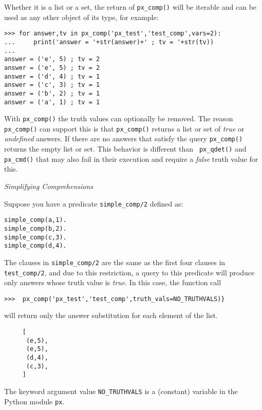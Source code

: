 \begin{example}
Whether it is a list or a set, the return of {\tt px\_comp()} will be
iterable and can be used as any other object of its type, for
example:

{\small
  \begin{verbatim}
>>> for answer,tv in px_comp('px_test','test_comp',vars=2):
...     print('answer = '+str(answer)+' ; tv = '+str(tv))
... 
answer = ('e', 5) ; tv = 2
answer = ('e', 5) ; tv = 2
answer = ('d', 4) ; tv = 1
answer = ('c', 3) ; tv = 1
answer = ('b', 2) ; tv = 1
answer = ('a', 1) ; tv = 1
\end{verbatim}
  }
\end{example}

With {\tt px\_comp()} the truth values can optionally be removed.  The
reason {\tt px\_comp()} can support this is that {\tt px\_comp()}
returns a list or set of {\em true} or {\em undefined} answers.  If
there are no answers that satisfy the query {\tt px\_comp()} returns
the empty list or set.  This behavior is different than {\tt
  px\_qdet()} and {\tt px\_cmd()} that may also fail in their
execution and require a {\em false} truth value for this.

\begin{example} \rm {\it Simplifying Comprehensions} \label{ex:simple-comp}

  Suppose you have a predicate {\tt simple\_comp/2} defined as:

{\small  
\begin{verbatim}  
simple_comp(a,1).
simple_comp(b,2).
simple_comp(c,3).
simple_comp(d,4).
\end{verbatim}
}

  The clauses in {\tt simple\_comp/2} are the same as the first four
  clauses in {\tt test\_comp/2}, and due to this restriction, a query
  to this predicate will produce only answers whose truth value is
  {\em true}.  In this case, the function call

\begin{verbatim}  
>>>  px_comp('px_test','test_comp',truth_vals=NO_TRUTHVALS)}
\end{verbatim}

will return only the answer substitution for each element of the list.

{\small  
\begin{verbatim}
     [
      (e,5),
      (e,5),
      (d,4),
      (c,3),
     ]
\end{verbatim}
}

The keyword argument value {\tt NO\_TRUTHVALS} is a (constant)
variable in the Python module {\tt px}.
\end{example}

